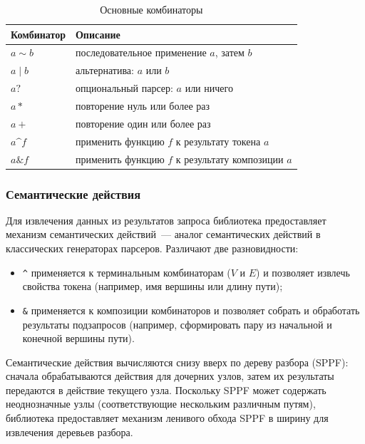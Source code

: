 \begin{table}[h]
    \centering
    \caption{Основные комбинаторы}
    \label{table:CFPQ_Combinators}
    \begin{tabular}{l|l}
        \hline
        Комбинатор & Описание \\
        \hline
        $a \sim b$  & последовательное применение $a$, затем $b$ \\
        $a \mid b$  & альтернатива: $a$ или $b$ \\
        $a?$        & опциональный парсер: $a$ или ничего \\
        $a*$        & повторение нуль или более раз \\
        $a+$        & повторение один или более раз \\
        $a \mathbin{\texttt{\textasciicircum}} f$ & применить функцию $f$ к результату токена $a$ \\
        $a \mathbin{\texttt{\&}} f$ & применить функцию $f$ к результату композиции $a$ \\
        \hline
    \end{tabular}
\end{table}

\subsubsection{Семантические действия}

Для извлечения данных из результатов запроса библиотека предоставляет механизм семантических действий~--- аналог семантических действий в классических генераторах парсеров.
Различают две разновидности:

\begin{itemize}
    \item \texttt{\textasciicircum} применяется к терминальным комбинаторам ($V$ и $E$) и позволяет извлечь свойства токена (например, имя вершины или длину пути);
    \item \texttt{\&} применяется к композиции комбинаторов и позволяет собрать и обработать результаты подзапросов (например, сформировать пару из начальной и конечной вершины пути).
\end{itemize}

Семантические действия вычисляются снизу вверх по дереву разбора (SPPF): сначала обрабатываются действия для дочерних узлов, затем их результаты передаются в действие текущего узла.
Поскольку SPPF может содержать неоднозначные узлы (соответствующие нескольким различным путям), библиотека предоставляет механизм ленивого обхода SPPF в ширину для извлечения деревьев разбора.

